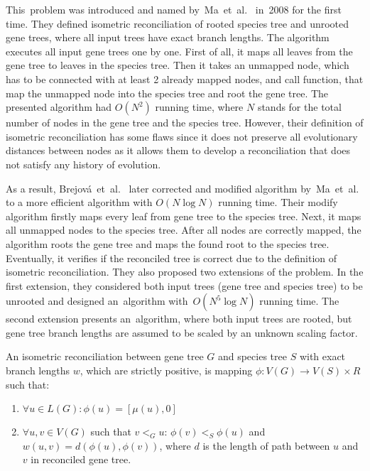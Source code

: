 This~problem was introduced and named by~Ma~et~al.~\cite{ma} in~2008 for the first time. They defined isometric reconciliation of rooted species tree and unrooted gene trees, where all input trees have exact branch lengths. The algorithm executes all input gene trees one by one. First of all, it maps all leaves from the gene tree to leaves in the species tree. Then it takes an unmapped node, which has to be connected with at least 2 already mapped nodes, and call function, that map the unmapped node into the species tree and root the gene tree. The presented algorithm had $O(N^2)$ running time, where $N$ stands for the total number of nodes in the gene tree and the species tree. However, their definition of isometric reconciliation has some flaws since it does not preserve all evolutionary distances between nodes as it allows them to develop a reconciliation that does not satisfy any history of evolution.

As a result, Brejová~et~al.~\cite{brejova} later corrected and modified algorithm by~Ma~et~al. to a more efficient algorithm with $O(N \log N)$ running time. Their modify algorithm firstly maps every leaf from gene tree to the species tree. Next, it maps all unmapped nodes to the species tree. After all nodes are correctly mapped, the algorithm roots the gene tree and maps the found root to the species tree. Eventually, it verifies if the reconciled tree is correct due to the definition of isometric reconciliation. They also proposed two extensions of the problem. In the first extension, they considered both input trees (gene tree and species tree) to be unrooted and designed an~algorithm with~$O(N^5 \log N)$ running time. The second extension presents an~algorithm, where both input trees are rooted, but gene tree branch lengths are assumed to be scaled by an unknown scaling factor.

\begin{definition}
An isometric reconciliation between gene tree $G$ and species tree $S$ with exact branch lengths $w$, which are strictly positive, is mapping $\phi: V(G) \rightarrow V(S) \times R$ such that:
	\begin{enumerate}\itemsep0em
	\item $\forall u \in L(G): \phi(u) = [\mu(u), 0]$
	\item $\forall u, v \in V(G)$ such that $v<_Gu$: $\phi(v)<_S\phi(u)$ and $w(u, v) = d(\phi(u), \phi(v))$, where $d$ is the length of path between $u$ and $v$ in reconciled gene tree.
	\end{enumerate}
\end{definition}

